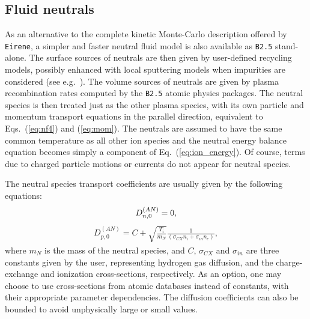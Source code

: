 \documentclass[a4paper,10pt]{report}
\begin{document}
\subsection{Fluid neutrals}

As an alternative to the complete kinetic Monte-Carlo description offered by {\tt Eirene},
a simpler and faster neutral fluid model is also available as {\tt B2.5} stand-alone. The surface sources of neutrals are
then given by user-defined recycling models, possibly enhanced with local sputtering models
when impurities are considered (see e.g.~\cite{Warrier04}). The volume sources of neutrals are given by
plasma recombination rates computed by the {\tt B2.5} atomic physics packages. The neutral species is then
treated just as the other plasma species, with its own particle and momentum transport equations in the parallel
direction, equivalent to Eqs.~(\ref{eq:nf4}) and (\ref{eq:mom}). The neutrals are assumed to have the same common
temperature as all other ion species and the neutral energy balance equation becomes simply a component
of Eq.~(\ref{eq:ion_energy}). Of course, terms due to charged particle motions or currents do not appear
for neutral species.

The neutral species transport coefficients are usually given by the following equations:
\begin{gather}\index{neutrals, transport coefficients}
 D^{(AN)}_{n,0} = 0,
\end{gather}
\begin{gather}
 D^{(AN)}_{p,0} = C + \sqrt{\frac{T_i}{m_N}} \frac{1}{( \sigma_{CX} n_i + \sigma_{in} n_e )},
\end{gather}
where $m_N$ is the mass of the neutral species, and $C$, $\sigma_{CX}$ and $\sigma_{in}$ are three constants given by
the user, representing hydrogen gas diffusion, and the charge-exchange and ionization cross-sections, respectively.
As an option, one may choose to use cross-sections from atomic databases instead of constants, with their appropriate
parameter dependencies. The diffusion coefficients can also be bounded to avoid unphysically large or small values.
\end{document}
